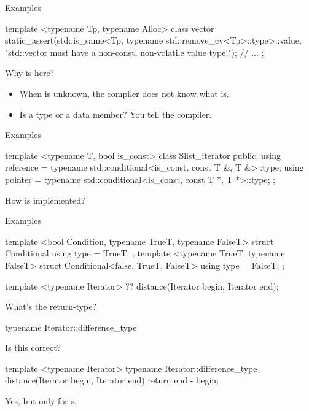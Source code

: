 \begin{frame}[fragile]{Examples}
    \begin{cpp}
template <typename Tp, typename Alloc>
class vector {
  static_assert(std::is_same<Tp, typename std::remove_cv<Tp>::type>::value, "std::vector must have a non-const, non-volatile value type!");
  // ...
};
    \end{cpp}
    Why is \typename here?
    \pause
    \begin{itemize}
        \item When  is unknown, the compiler does not know what  is.
        \item Is  a type or a  data member? You tell the compiler.
    \end{itemize}
\end{frame}

\begin{frame}[fragile]{Examples}
    \begin{cpp}
template <typename T, bool is_const>
class Slist_iterator {
 public:
  using reference = typename std::conditional<is_const, const T &, T &>::type;
  using pointer = typename std::conditional<is_const, const T *, T *>::type;
};
    \end{cpp}
    \pause
    How is  implemented?
\end{frame}

\begin{frame}[fragile]{Examples}
    \begin{cpp}
template <bool Condition, typename TrueT, typename FalseT>
struct Conditional {
  using type = TrueT;
};
template <typename TrueT, typename FalseT>
struct Conditional<false, TrueT, FalseT> {
  using type = FalseT;
};
    \end{cpp}
\end{frame}

\begin{frame}[fragile]{}
    \begin{cpp}
template <typename Iterator>
?? distance(Iterator begin, Iterator end);
    \end{cpp}
    What's the return-type?
    \pause
    \begin{cpp}
typename Iterator::difference_type
    \end{cpp}
\end{frame}

\begin{frame}[fragile]{}
    Is this correct?
    \begin{cpp}
template <typename Iterator>
  typename Iterator::difference_type
    distance(Iterator begin, Iterator end) {
  return end - begin;
}
    \end{cpp}
    \pause
    Yes, but only for s.
\end{frame}

